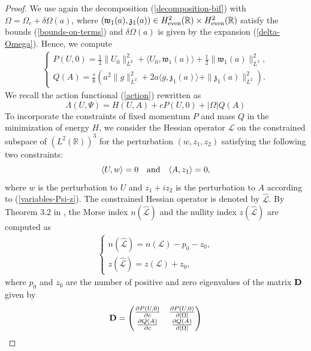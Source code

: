 \documentclass[12pt,reqno]{amsart}
\numberwithin{equation}{section}
\begin{document}
\begin{proof}
We use again the decomposition (\ref{decomposition-bif}) with $\Omega = \Omega_c + \delta \Omega(a)$, where $(\mathfrak{w}_1(a), \mathfrak{z}_1(a)) \in H^2_{\rm even}(\mathbb{R}) \times H^2_{\rm even}(\mathbb{R})$ satisfy the bounds (\ref{bounds-on-terms}) 
and $\delta \Omega(a)$ is given by the expansion (\ref{delta-Omega}). Hence, we 
compute 
\begin{align}
\left\{ \begin{array}{l}
    P(U,0) = \frac{1}{2} \| U_0 \|^2_{L^2} + \langle U_0, \mathfrak{w}_1(a) \rangle + \frac{1}{2} \| \mathfrak{w}_1(a) \|^2_{L^2}, \\
    Q(A) = \frac{s}{k} \left( a^2 \| g \|^2_{L^2} + 2 a \langle g, \mathfrak{z}_1(a) \rangle + \| \mathfrak{z}_1(a) \|^2_{L^2} \right).
    \end{array} \right.
    \label{P-Q-expansion}
\end{align}
We recall the action functional (\ref{action}) rewritten as 
$$
\Lambda(U,\Psi) = H(U,A) + c P(U,0) + |\Omega| Q(A)
$$
To incorporate the constraints of fixed momentum $P$ and mass $Q$ in the minimization of energy $H$, we consider the Hessian operator $\mathcal{L}$
on the constrained subspace of $(L^2(\mathbb{R}))^3$ 
for the perturbation $(w,z_1,z_2)$ satisfying the following two constraints:
$$
\langle U, w \rangle = 0 \quad \mbox{\rm and} \quad \langle A, z_1 \rangle = 0,
$$
where $w$ is the perturbation to $U$ and $z_1 + i z_2$ is the perturbation to $A$ according to (\ref{variables-Psi-z}).
The constrained Hessian operator is denoted by \(\hat{\mathcal{L}}\). 
By Theorem 3.2 in \cite{Dmitry}, the Morse index $n(\hat{\mathcal{L}})$
and the nullity index $z(\hat{\mathcal{L}})$ are computed as 
\begin{align}
\left\{ \begin{array}{l}
n(\hat{\mathcal{L}}) = n(\mathcal{L})-p_0-z_0, \\
z(\hat{\mathcal{L}}) = z(\mathcal{L}) + z_0,
    \end{array} \right.
\label{index-count}
\end{align}
where $p_0$ and $z_0$ are the number of positive and zero  eigenvalues of the matrix ${\bf D}$ given by 
\begin{align*}
{\bf D} = 
\begin{pmatrix}
    \frac{\partial P(U,0)}{\partial c} & \frac{\partial P(U,0)}{\partial |\Omega|} \\
    \frac{\partial Q(A)}{\partial c} & \frac{\partial Q(A)}{\partial |\Omega|}   

\end{pmatrix}
\end{align*}
\end{proof}
\end{document}
